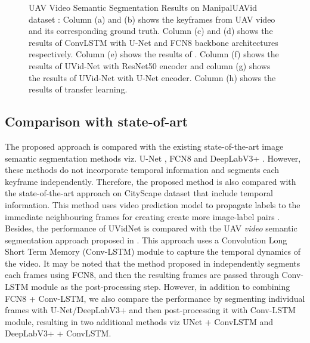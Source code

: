 \documentclass[journal]{IEEEtran}
\begin{document}
\begin{figure*}[!t]
\begin{tabular}{cccccccc}
	\end{tabular}
	\caption{ UAV Video Semantic Segmentation Results on ManipalUAVid dataset \cite{19}:  Column (a) and (b) shows the keyframes from UAV video and its corresponding ground truth. Column (c) and (d) shows the results of ConvLSTM with U-Net and FCN8 backbone architectures respectively. Column (e) shows the results of \cite{22}. Column (f) shows the results of UVid-Net with ResNet50 encoder and column (g) shows the results of UVid-Net with U-Net encoder. Column (h) shows the results of transfer learning.}
	\label{fig:SOTA}
	
\end{figure*}


\subsection {Comparison with state-of-art}
\label{Sec:SOTAComp}

\par The proposed approach is compared with the existing state-of-the-art image semantic segmentation methods viz. U-Net \cite{2},  FCN8 \cite{4} and DeepLabV3+ \cite{33}. However, these methods do not incorporate temporal information and segments each keyframe independently. Therefore, the proposed method is also compared with the state-of-the-art approach \cite{22} on CityScape dataset that include temporal information. This method uses video prediction model to propagate labels to the immediate neighbouring frames for creating create more image-label pairs \cite{22}.  Besides, the performance of UVidNet is compared with the UAV \textit{video} semantic segmentation approach proposed in \cite{wang2019deep}. This approach uses a Convolution Long Short Term Memory (Conv-LSTM) module to capture the temporal dynamics of the video. It may be noted that the method proposed in  \cite{wang2019deep} independently segments each frames using FCN8, and then the resulting frames are passed through Conv-LSTM module as the post-processing step. However, in addition to combining FCN8 + Conv-LSTM, we also compare the performance by segmenting individual frames with U-Net/DeepLabV3+ and then post-processing it with Conv-LSTM module, resulting in two additional methods viz UNet + ConvLSTM and DeepLabV3+ + ConvLSTM. 
\end{document}
